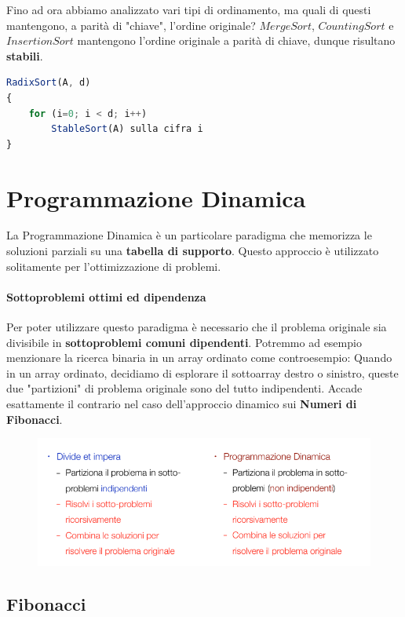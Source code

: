 \documentclass{article}
\begin{document}
Fino ad ora abbiamo analizzato vari tipi di ordinamento, ma quali di questi mantengono, a parità di "chiave", l'ordine originale? $Merge Sort$, $Counting Sort$ e $Insertion Sort$ mantengono l'ordine originale a parità di chiave, dunque risultano \textbf{stabili}.

\begin{lstlisting}[language=JavaScript]
RadixSort(A, d)
{
    for (i=0; i < d; i++)
        StableSort(A) sulla cifra i
}
\end{lstlisting}

\section{Programmazione Dinamica}

La Programmazione Dinamica è un particolare paradigma che memorizza le soluzioni parziali su una \textbf{tabella di supporto}. Questo approccio è utilizzato solitamente per l'ottimizzazione di problemi.

\paragraph{Sottoproblemi ottimi ed dipendenza} Per poter utilizzare questo paradigma è necessario che il problema originale sia divisibile in \textbf{sottoproblemi comuni dipendenti}. Potremmo ad esempio menzionare la ricerca binaria in un array ordinato come controesempio: Quando in un array ordinato, decidiamo di esplorare il sottoarray destro o sinistro, queste due "partizioni" di problema originale sono del tutto indipendenti. Accade esattamente il contrario nel caso dell'approccio dinamico sui \textbf{Numeri di Fibonacci}.

\begin{figure}[htbp]
        \center
        \includegraphics[scale=0.7]{img/ricVSdin.png}
    \end{figure}

\newpage

\subsection{Fibonacci}
\end{document}
